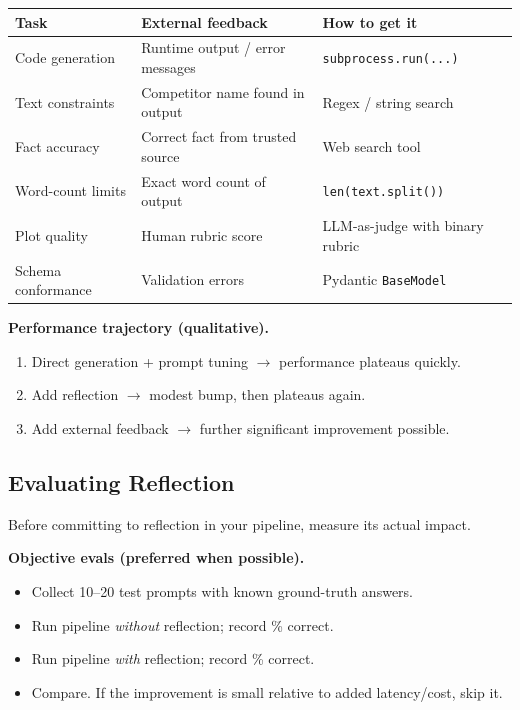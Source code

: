 \documentclass[a4paper,11pt]{article}
\begin{document}
\begin{center}\small
\begin{tabular}{p{4cm} p{5cm} p{4cm}}
  \toprule
  \textbf{Task} & \textbf{External feedback} & \textbf{How to get it} \\
  \midrule
  Code generation    & Runtime output / error messages       & \texttt{subprocess.run(...)} \\
  Text constraints   & Competitor name found in output       & Regex / string search \\
  Fact accuracy      & Correct fact from trusted source      & Web search tool \\
  Word-count limits  & Exact word count of output            & \texttt{len(text.split())} \\
  Plot quality       & Human rubric score                    & LLM-as-judge with binary rubric \\
  Schema conformance & Validation errors                     & Pydantic \texttt{BaseModel} \\
  \bottomrule
\end{tabular}
\end{center}

\textbf{Performance trajectory (qualitative).}
\begin{enumerate}[noitemsep, leftmargin=1.4em]
  \item Direct generation + prompt tuning $\to$ performance plateaus
        quickly.
  \item Add reflection $\to$ modest bump, then plateaus again.
  \item Add external feedback $\to$ further significant improvement
        possible.
\end{enumerate}

\subsection{Evaluating Reflection}

Before committing to reflection in your pipeline, measure its actual
impact.

\textbf{Objective evals (preferred when possible).}
\begin{itemize}[noitemsep, leftmargin=1.2em]
  \item Collect 10–20 test prompts with known ground-truth answers.
  \item Run pipeline \textit{without} reflection; record \% correct.
  \item Run pipeline \textit{with} reflection; record \% correct.
  \item Compare. If the improvement is small relative to added
        latency/cost, skip it.
\end{itemize}
\end{document}
